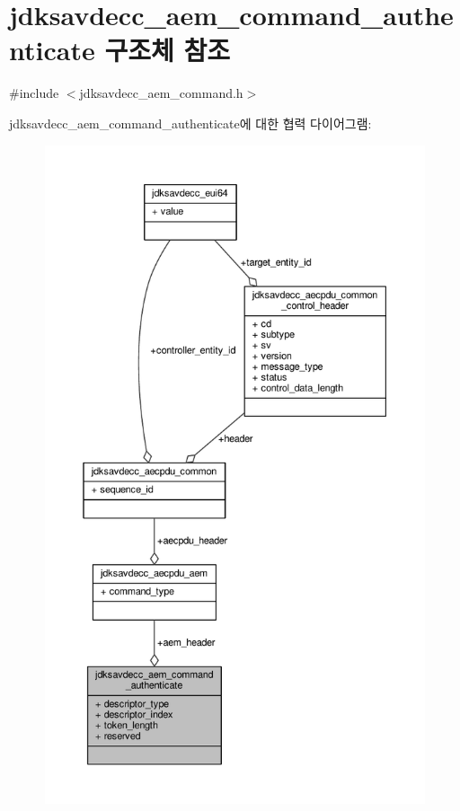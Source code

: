 \hypertarget{structjdksavdecc__aem__command__authenticate}{}\section{jdksavdecc\+\_\+aem\+\_\+command\+\_\+authenticate 구조체 참조}
\label{structjdksavdecc__aem__command__authenticate}


{\ttfamily \#include $<$jdksavdecc\+\_\+aem\+\_\+command.\+h$>$}



jdksavdecc\+\_\+aem\+\_\+command\+\_\+authenticate에 대한 협력 다이어그램\+:
\nopagebreak
\begin{figure}[H]
\begin{center}
\leavevmode
\includegraphics[height=550pt]{structjdksavdecc__aem__command__authenticate__coll__graph}
\end{center}
\end{figure}
